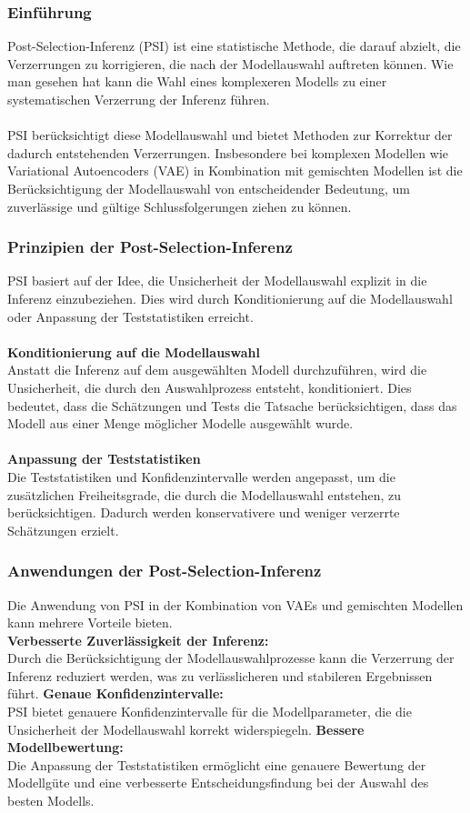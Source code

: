 \documentclass[%
thesis=student,%
coverpage=false,%
titlepage=false,%
headmarks=true, %
german,%
font=libertine, %
math=newpxtx, %
BCOR=5mm,%
coverBCOR=11mm%
]{tumbook}
\theoremstyle{break}
\begin{document}
\subsubsection{Einführung}
Post-Selection-Inferenz (PSI) ist eine statistische Methode, die darauf abzielt, die Verzerrungen zu korrigieren, die nach der Modellauswahl auftreten können. Wie man gesehen hat kann die Wahl eines komplexeren Modells zu einer systematischen Verzerrung der Inferenz führen.\\
\\
PSI berücksichtigt diese Modellauswahl und bietet Methoden zur Korrektur der dadurch entstehenden Verzerrungen. Insbesondere bei komplexen Modellen wie Variational Autoencoders (VAE) in Kombination mit gemischten Modellen ist die Berücksichtigung der Modellauswahl von entscheidender Bedeutung, um zuverlässige und gültige Schlussfolgerungen ziehen zu können.

\subsubsection{Prinzipien der Post-Selection-Inferenz}
PSI basiert auf der Idee, die Unsicherheit der Modellauswahl explizit in die Inferenz einzubeziehen. Dies wird durch Konditionierung auf die Modellauswahl oder Anpassung der Teststatistiken erreicht.\\
\\
\textbf{Konditionierung auf die Modellauswahl}\\
Anstatt die Inferenz auf dem ausgewählten Modell durchzuführen, wird die Unsicherheit, die durch den Auswahlprozess entsteht, konditioniert. Dies bedeutet, dass die Schätzungen und Tests die Tatsache berücksichtigen, dass das Modell aus einer Menge möglicher Modelle ausgewählt wurde.\\
\\
\textbf{Anpassung der Teststatistiken}\\
Die Teststatistiken und Konfidenzintervalle werden angepasst, um die zusätzlichen Freiheitsgrade, die durch die Modellauswahl entstehen, zu berücksichtigen. Dadurch werden konservativere und weniger verzerrte Schätzungen erzielt.
\subsubsection{Anwendungen der Post-Selection-Inferenz}
Die Anwendung von PSI in der Kombination von VAEs und gemischten Modellen kann mehrere Vorteile bieten.
\\
\textbf{Verbesserte Zuverlässigkeit der Inferenz:}\\
Durch die Berücksichtigung der Modellauswahlprozesse kann die Verzerrung der Inferenz reduziert werden, was zu verlässlicheren und stabileren Ergebnissen führt.
\textbf{Genaue Konfidenzintervalle:}\\
PSI bietet genauere Konfidenzintervalle für die Modellparameter, die die Unsicherheit der Modellauswahl korrekt widerspiegeln.
\textbf{Bessere Modellbewertung:}\\ 
Die Anpassung der Teststatistiken ermöglicht eine genauere Bewertung der Modellgüte und eine verbesserte Entscheidungsfindung bei der Auswahl des besten Modells.
\end{document}
